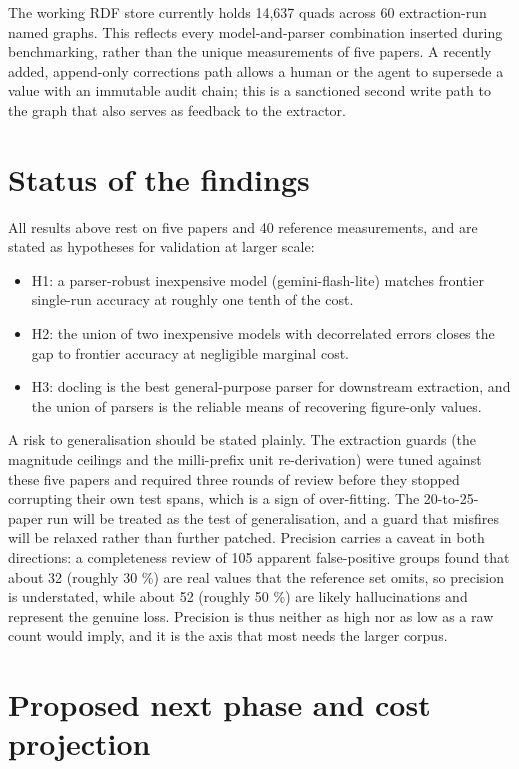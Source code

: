 The working RDF store currently holds 14,637 quads across 60
extraction-run named graphs. This reflects every model-and-parser
combination inserted during benchmarking, rather than the unique
measurements of five papers. A recently added, append-only corrections
path allows a human or the agent to supersede a value with an immutable
audit chain; this is a sanctioned second write path to the graph that
also serves as feedback to the extractor.

\section{Status of the findings}\label{status-of-the-findings}

All results above rest on five papers and 40 reference measurements, and
are stated as hypotheses for validation at larger scale:

\begin{itemize}
\tightlist
\item
  H1: a parser-robust inexpensive model (gemini-flash-lite) matches
  frontier single-run accuracy at roughly one tenth of the cost.
\item
  H2: the union of two inexpensive models with decorrelated errors
  closes the gap to frontier accuracy at negligible marginal cost.
\item
  H3: docling is the best general-purpose parser for downstream
  extraction, and the union of parsers is the reliable means of
  recovering figure-only values.
\end{itemize}

A risk to generalisation should be stated plainly. The extraction guards
(the magnitude ceilings and the milli-prefix unit re-derivation) were
tuned against these five papers and required three rounds of review
before they stopped corrupting their own test spans, which is a sign of
over-fitting. The 20-to-25-paper run will be treated as the test of
generalisation, and a guard that misfires will be relaxed rather than
further patched. Precision carries a caveat in both directions: a
completeness review of 105 apparent false-positive groups found that
about 32 (roughly 30 \%) are real values that the reference set omits,
so precision is understated, while about 52 (roughly 50 \%) are likely
hallucinations and represent the genuine loss. Precision is thus neither
as high nor as low as a raw count would imply, and it is the axis that
most needs the larger corpus.

\section{Proposed next phase and cost
projection}\label{proposed-next-phase-and-cost-projection}

